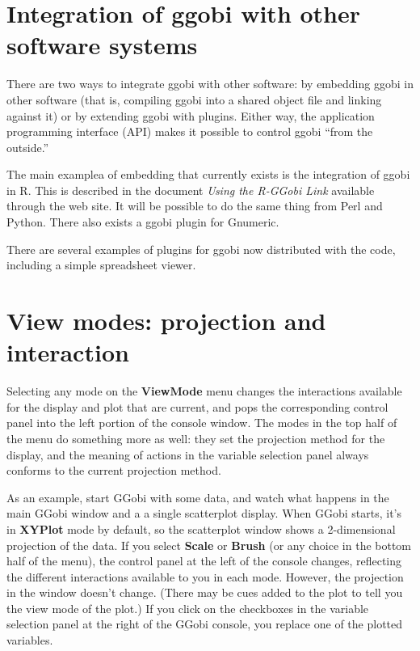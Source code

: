 \documentclass[11pt]{article}
\begin{document}
\section{Integration of ggobi with other software systems}
\label{slbl:Integration}

There are two ways to integrate ggobi with other software: by embedding
ggobi in other software (that is, compiling ggobi into a shared object
file and linking against it) or by extending ggobi with plugins.  Either
way, the application programming interface (API) makes it possible to
control ggobi ``from the outside.''

The main examplea of embedding that currently exists is the integration
of ggobi in R. This is described in the document {\em Using the R-GGobi
Link} available through the web site.   It will be possible to do the
same thing from Perl and Python.  There also exists a ggobi plugin
for Gnumeric.

There are several examples of plugins for ggobi now distributed with
the code, including a simple spreadsheet viewer.

\section{View modes: projection and interaction}
\label{slbl:ViewModes}

Selecting any mode on the {\bf ViewMode} menu changes the interactions
available for the display and plot that are current, and pops the
corresponding control panel into the left portion of the console
window.  The modes in the top half of the menu do something more as
well:  they set the projection method for the display, and the meaning
of actions in the variable selection panel always conforms to the current
projection method.

As an example, start GGobi with some data, and watch what happens in
the main GGobi window and a a single scatterplot display.   When
GGobi starts, it's in {\bf XYPlot} mode by default, so the
scatterplot window shows a 2-dimensional projection of the data.  If
you select {\bf Scale} or {\bf Brush} (or any choice in the bottom
half of the menu), the control panel at the left of the console
changes, reflecting the different interactions available to you in
each mode.  However, the projection in the window doesn't change.
(There may be cues added to the plot to tell you the view mode of the
plot.) If you click on the checkboxes in the variable selection panel
at the right of the GGobi console, you replace one of the plotted
variables.
\end{document}
